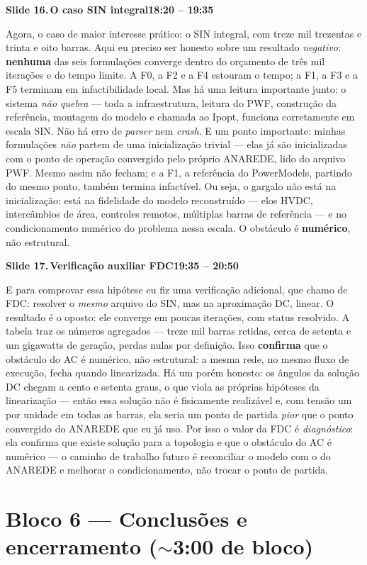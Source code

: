 \documentclass[11pt,a4paper]{article}
\newcommand{\slide}[3]{%
  \bigskip
  \noindent\colorbox{chipbg}{\parbox{\dimexpr\linewidth-2\fboxsep\relax}{%
    \textbf{\textcolor{ufcblue}{#1}}\,\textbf{#2}\hfill\textbf{\textcolor{ufcblue}{#3}}}}\par
  \nopagebreak\medskip
}
\begin{document}
\slide{Slide 16.}{O caso SIN integral}{18:20 -- 19:35}
Agora, o caso de maior interesse prático: o SIN integral, com treze mil trezentas e trinta e oito barras. Aqui eu preciso ser honesto sobre um resultado \emph{negativo}: \textbf{nenhuma} das seis formulações converge dentro do orçamento de três mil iterações e do tempo limite. A F0, a F2 e a F4 estouram o tempo; a F1, a F3 e a F5 terminam em infactibilidade local. Mas há uma leitura importante junto: o sistema \emph{não quebra} --- toda a infraestrutura, leitura do PWF, construção da referência, montagem do modelo e chamada ao Ipopt, funciona corretamente em escala SIN. Não há erro de \textit{parser} nem \textit{crash}. E um ponto importante: minhas formulações \emph{não} partem de uma inicialização trivial --- elas já são inicializadas com o ponto de operação convergido pelo próprio ANAREDE, lido do arquivo PWF. Mesmo assim não fecham; e a F1, a referência do PowerModels, partindo do mesmo ponto, também termina infactível. Ou seja, o gargalo não está na inicialização: está na fidelidade do modelo reconstruído --- elos HVDC, intercâmbios de área, controles remotos, múltiplas barras de referência --- e no condicionamento numérico do problema nessa escala. O obstáculo é \textbf{numérico}, não estrutural.

\slide{Slide 17.}{Verificação auxiliar FDC}{19:35 -- 20:50}
E para comprovar essa hipótese eu fiz uma verificação adicional, que chamo de FDC: resolver o \emph{mesmo} arquivo do SIN, mas na aproximação DC, linear. O resultado é o oposto: ele converge em poucas iterações, com status resolvido. A tabela traz os números agregados --- treze mil barras retidas, cerca de setenta e um gigawatts de geração, perdas nulas por definição. Isso \textbf{confirma} que o obstáculo do AC é numérico, não estrutural: a mesma rede, no mesmo fluxo de execução, fecha quando linearizada. Há um porém honesto: os ângulos da solução DC chegam a cento e setenta graus, o que viola as próprias hipóteses da linearização --- então essa solução não é fisicamente realizável e, com tensão um por unidade em todas as barras, ela seria um ponto de partida \emph{pior} que o ponto convergido do ANAREDE que eu já uso. Por isso o valor da FDC é \emph{diagnóstico}: ela confirma que existe solução para a topologia e que o obstáculo do AC é numérico --- o caminho de trabalho futuro é reconciliar o modelo com o do ANAREDE e melhorar o condicionamento, não trocar o ponto de partida.

\section*{\textcolor{ufcblue}{Bloco 6 --- Conclusões e encerramento ($\sim$3:00 de bloco)}}
\end{document}
